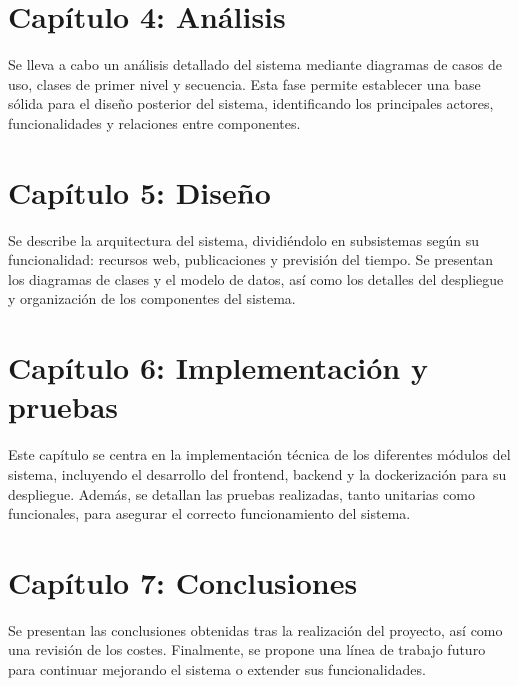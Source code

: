 \section*{Capítulo 4: Análisis}
Se lleva a cabo un análisis detallado del sistema mediante diagramas de casos de uso, clases de primer nivel y secuencia. Esta fase permite establecer una base sólida para el diseño posterior del sistema, identificando los principales actores, funcionalidades y relaciones entre componentes.

\section*{Capítulo 5: Diseño}
Se describe la arquitectura del sistema, dividiéndolo en subsistemas según su funcionalidad: recursos web, publicaciones y previsión del tiempo. Se presentan los diagramas de clases y el modelo de datos, así como los detalles del despliegue y organización de los componentes del sistema.

\section*{Capítulo 6: Implementación y pruebas}
Este capítulo se centra en la implementación técnica de los diferentes módulos del sistema, incluyendo el desarrollo del \gls{frontend}, \gls{backend} y la dockerización para su despliegue. Además, se detallan las pruebas realizadas, tanto unitarias como funcionales, para asegurar el correcto funcionamiento del sistema.

\section*{Capítulo 7: Conclusiones}
Se presentan las conclusiones obtenidas tras la realización del proyecto, así como una revisión de los costes. Finalmente, se propone una línea de trabajo futuro para continuar mejorando el sistema o extender sus funcionalidades.
